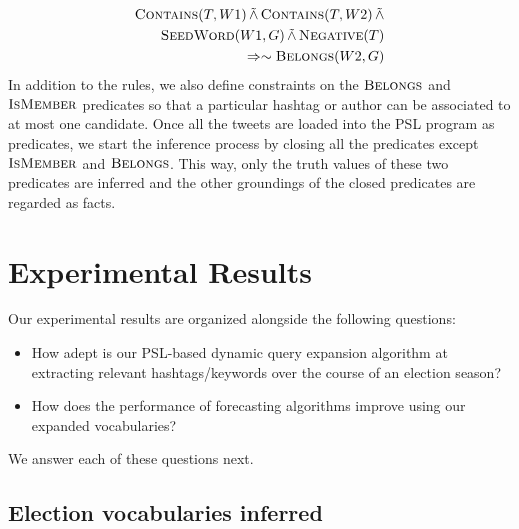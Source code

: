 \begin{align*}
\begin{split}
\textsc{Contains}(T,W1) 
	\softand \textsc{Contains}(T,W2)
	\softand \\
	 \textsc{SeedWord}(W1,G)
	\softand \textsc{Negative}(T)\\
	\Rightarrow \sim \textsc{Belongs}(W2,G)
\end{split}
\end{align*}
In addition to the rules, we also define constraints on the $\textsc{Belongs}$ and $\textsc{IsMember}$ predicates so that a particular hashtag or author can be associated to at most one candidate. 
Once all the tweets are loaded into the PSL program as predicates, we start the inference process by closing all the predicates except $\textsc{IsMember}$ and $\textsc{Belongs}$. 
This way, only the truth values of these two predicates are inferred and the other groundings of the closed predicates are regarded as facts.

\section{Experimental Results}
Our experimental results are organized alongside the following questions:
\begin{itemize}
\item How adept is our PSL-based dynamic query expansion algorithm at extracting relevant hashtags/keywords over the course
of an election season?
\item How does the performance of forecasting algorithms improve using our expanded vocabularies?
\end{itemize}
We answer each of these questions next.

\subsection{Election vocabularies inferred}

